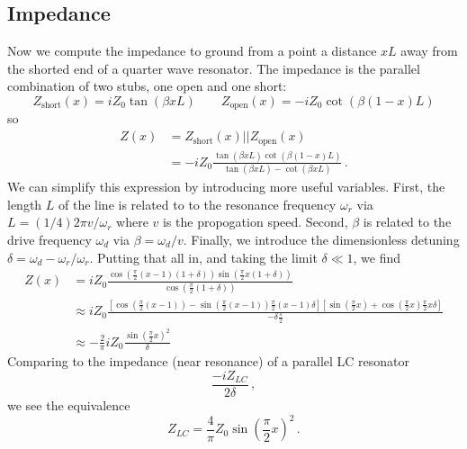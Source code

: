 \documentclass{article}
\begin{document}
\subsection{Impedance}


Now we compute the impedance to ground from a point a distance $x L$ away from the shorted end of a quarter wave resonator.
The impedance is the parallel combination of two stubs, one open and one short:
\begin{equation}
  Z_\text{short}(x) = i Z_0 \tan \left( \beta x L \right)
  \qquad 
  Z_\text{open}(x) = -i Z_0 \cot \left( \beta (1-x) L \right)
\end{equation}
so
\begin{align}
  Z(x)
  &= Z_\text{short}(x) \lvert \lvert Z_\text{open}(x) \nonumber \\
  &= -i Z_0 \frac{\tan(\beta x L) \cot(\beta (1 - x) L)}{\tan(\beta x L) - \cot(\beta x L)} \, .
\end{align}
We can simplify this expression by introducing more useful variables.
First, the length $L$ of the line is related to to the resonance frequency $\omega_r$ via $L = (1/4)2 \pi v / \omega_r$ where $v$ is the propogation speed.
Second, $\beta$ is related to the drive frequency $\omega_d$ via $\beta = \omega_d / v$.
Finally, we introduce the dimensionless detuning $\delta = \omega_d - \omega_r / \omega_r$.
Putting that all in, and taking the limit $\delta \ll 1$, we find
\begin{align}
  Z(x)
  &= i Z_0 \frac{
    \cos \left( \frac{\pi}{2} (x - 1) (1 + \delta) \right)
    \sin \left( \frac{\pi}{2} x (1 + \delta) \right)}
  {\cos \left( \frac{\pi}{2} (1 + \delta) \right)} \nonumber \\
  &\approx i Z_0 \frac{
    \left[
      \cos\left(\frac{\pi}{2}(x-1)\right) - \sin\left(\frac{\pi}{2}(x-1)\right) \frac{\pi}{2}(x-1)\delta
  \right]
  \left[
    \sin\left(\frac{\pi}{2}x\right) + \cos\left(\frac{\pi}{2}x\right)\frac{\pi}{2}x\delta
  \right]
  }{-\delta \frac{\pi}{2}} \nonumber \\
  &\approx - \frac{2}{\pi} i Z_0 \frac{\sin \left(\frac{\pi}{2} x \right)^2}{\delta}
\end{align}
Comparing to the impedance (near resonance) of a parallel LC resonator
\begin{equation*}
  \frac{-i Z_{LC}}{2 \delta} \, ,
\end{equation*}
we see the equivalence
\begin{equation}
  Z_{LC} = \frac{4}{\pi} Z_0 \sin\left(\frac{\pi}{2} x \right)^2 \, .
\end{equation}
\end{document}
